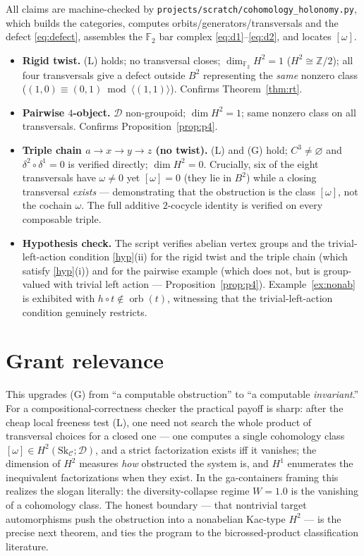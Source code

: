 \documentclass[11pt]{article}
\theoremstyle{definition}
\newcommand{\C}{\mathcal{C}}
\newcommand{\D}{\mathcal{D}}
\newcommand{\Sk}{\mathrm{Sk}}
\newcommand{\orb}{\operatorname{orb}}
\newcommand{\1}{\mathbf{1}}
\begin{document}
All claims are machine-checked by \texttt{projects/scratch/cohomology\_holonomy.py},
which builds the categories, computes orbits/generators/transversals and the defect
\eqref{eq:defect}, assembles the $\mathbb F_2$ bar complex \eqref{eq:d1}--\eqref{eq:d2},
and locates $[\omega]$.
\begin{itemize}
\item \textbf{Rigid twist.} \textnormal{(L)} holds; no transversal closes;
$\dim_{\mathbb F_2}H^2=1$ ($H^2\cong\mathbb Z/2$); all four transversals give a
defect outside $B^2$ representing the \emph{same} nonzero class
($(1,0)\equiv(0,1)\bmod\langle(1,1)\rangle$). Confirms Theorem~\ref{thm:rt}.
\item \textbf{Pairwise $4$-object.} $\D$ non-groupoid; $\dim H^2=1$; same nonzero
class on all transversals. Confirms Proposition~\ref{prop:p4}.
\item \textbf{Triple chain $a\to x\to y\to z$ (no twist).} \textnormal{(L)} and
\textnormal{(G)} hold; $C^3\neq\varnothing$ and $\delta^2\circ\delta^1=0$ is
verified directly; $\dim H^2=0$. Crucially, six of the eight transversals have
$\omega\neq0$ yet $[\omega]=0$ (they lie in $B^2$) while a closing transversal
\emph{exists} --- demonstrating that the obstruction is the class $[\omega]$, not
the cochain $\omega$. The full additive $2$-cocycle identity is verified on every
composable triple.
\item \textbf{Hypothesis check.} The script verifies abelian vertex groups and the
trivial-left-action condition \ref{hyp}(ii) for the rigid twist and the triple
chain (which satisfy \ref{hyp}(i)) and for the pairwise example (which does not,
but is group-valued with trivial left action --- Proposition~\ref{prop:p4}).
Example~\ref{ex:nonab} is exhibited with $h\circ t\notin\orb(t)$, witnessing that
the trivial-left-action condition genuinely restricts.
\end{itemize}

\section{Grant relevance}

This upgrades \textnormal{(G)} from ``a computable obstruction'' to ``a computable
\emph{invariant}.'' For a compositional-correctness checker the practical payoff is
sharp: after the cheap local freeness test \textnormal{(L)}, one need not search the
whole product of transversal choices for a closed one --- one computes a single
cohomology class $[\omega]\in H^2(\Sk_\C;\D)$, and a strict factorization exists iff
it vanishes; the dimension of $H^2$ measures \emph{how} obstructed the system is,
and $H^1$ enumerates the inequivalent factorizations when they exist. In the
ga-containers framing this realizes the slogan literally: the diversity-collapse
regime $W=1.0$ is the vanishing of a cohomology class. The honest boundary --- that
nontrivial target automorphisms push the obstruction into a nonabelian Kac-type
$H^2$ --- is the precise next theorem, and ties the program to the bicrossed-product
classification literature.
\end{document}
